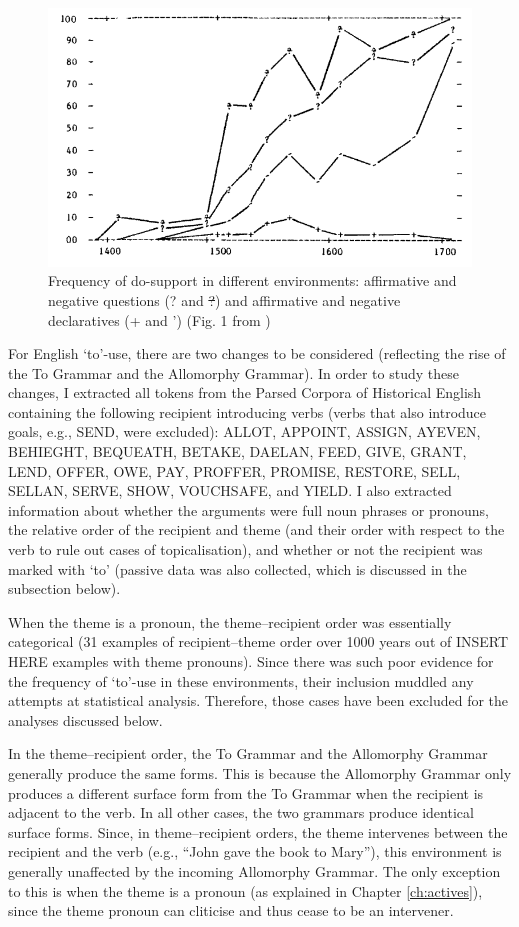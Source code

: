	\begin{figure}[ht!]
		\includegraphics[width=.5\linewidth]{../images/kroch-graph}
		\caption{Frequency of do-support in different environments: affirmative and negative questions (? and \sout{?}) and affirmative and negative declaratives (+ and ') (Fig. 1 from \citealt{Kroch.1989})}
		\label{fig:kroch-graph}
	\end{figure}

	For English `to'-use, there are two changes to be considered (reflecting the rise of the To Grammar and the Allomorphy Grammar). In order to study these changes, I extracted all tokens from the Parsed Corpora of Historical English \citep{Kroch.2000,Taylor.2003,Kroch.2004,Taylor.2006,Kroch.2010} containing the following recipient introducing verbs (verbs that also introduce goals, e.g., SEND, were excluded): ALLOT, APPOINT, ASSIGN, AYEVEN, BEHIEGHT, BEQUEATH, BETAKE, DAELAN, FEED, GIVE, GRANT, LEND, OFFER, OWE, PAY, PROFFER, PROMISE, RESTORE, SELL, SELLAN, SERVE, SHOW, VOUCHSAFE, and YIELD. I also extracted information about whether the arguments were full noun phrases or pronouns, the relative order of the recipient and theme (and their order with respect to the verb to rule out cases of topicalisation), and whether or not the recipient was marked with `to' (passive data was also collected, which is discussed in the subsection below). 
	
	When the theme is a pronoun, the theme--recipient order was essentially categorical (31 examples of recipient--theme order over 1000 years out of INSERT HERE examples with theme pronouns). Since there was such poor evidence for the frequency of `to'-use in these environments, their inclusion muddled any attempts at statistical analysis. Therefore, those cases have been excluded for the analyses discussed below.

	In the theme--recipient order, the To Grammar and the Allomorphy Grammar generally produce the same forms. This is because the Allomorphy Grammar only produces a different surface form from the To Grammar when the recipient is adjacent to the verb. In all other cases, the two grammars produce identical surface forms. Since, in theme--recipient orders, the theme intervenes between the recipient and the verb (e.g., ``John gave the book to Mary''), this environment is generally unaffected by the incoming Allomorphy Grammar. The only exception to this is when the theme is a pronoun (as explained in Chapter \ref{ch:actives}), since the theme pronoun can cliticise and thus cease to be an intervener.

